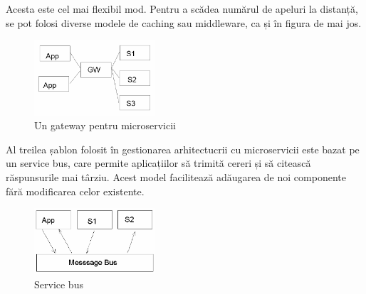 \documentclass[12pt, a4paper, twocolumn]{article} %
\begin{document}
Acesta este cel mai flexibil mod. Pentru a scădea numărul de apeluri la distanță, se pot folosi diverse modele de caching sau middleware, ca și în figura de mai jos.

\begin{figure}[h]
\caption{Un gateway pentru microservicii}
\centering
\includegraphics[width=0.4\textwidth]{gateway}
\end{figure}

Al treilea șablon folosit în gestionarea arhitectucrii cu microservicii este bazat pe un service bus, care permite aplicațiilor să trimită cereri și să citească răspunsurile mai târziu. Acest model facilitează adăugarea de noi componente fără modificarea celor existente.

\begin{figure}[h]
\caption{Service bus}
\centering
\includegraphics[width=0.4\textwidth]{bus}
\end{figure}

\clearpage
\end{document}
